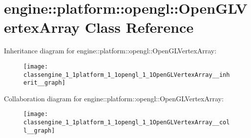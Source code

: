 \hypertarget{classengine_1_1platform_1_1opengl_1_1OpenGLVertexArray}{}\section{engine\+:\+:platform\+:\+:opengl\+:\+:Open\+G\+L\+Vertex\+Array Class Reference}
\label{classengine_1_1platform_1_1opengl_1_1OpenGLVertexArray}


Inheritance diagram for engine\+:\+:platform\+:\+:opengl\+:\+:Open\+G\+L\+Vertex\+Array\+:
\nopagebreak
\begin{figure}[H]
\begin{center}
\leavevmode
\texttt{[image: classengine\_1\_1platform\_1\_1opengl\_1\_1OpenGLVertexArray\_\_inherit\_\_graph]}
\end{center}
\end{figure}


Collaboration diagram for engine\+:\+:platform\+:\+:opengl\+:\+:Open\+G\+L\+Vertex\+Array\+:
\nopagebreak
\begin{figure}[H]
\begin{center}
\leavevmode
\texttt{[image: classengine\_1\_1platform\_1\_1opengl\_1\_1OpenGLVertexArray\_\_coll\_\_graph]}
\end{center}
\end{figure}
